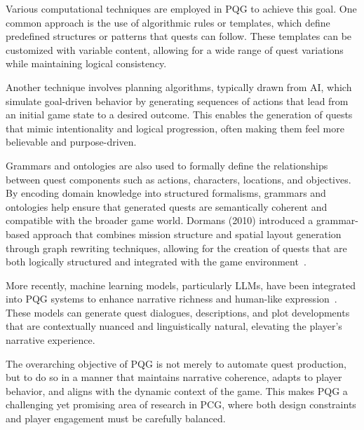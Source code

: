 Various computational techniques are employed in PQG to achieve this goal. One
common approach is the use of algorithmic rules or templates, which define predefined
structures or patterns that quests can follow. These templates can be customized with
variable content, allowing for a wide range of quest variations while maintaining logical
consistency.

Another technique involves planning algorithms, typically drawn from AI, which simulate
goal-driven behavior by generating sequences of actions that lead from an initial game
state to a desired outcome. This enables the generation of quests that mimic intentionality
and logical progression, often making them feel more believable and purpose-driven.

Grammars and ontologies are also used to formally define the relationships between
quest components such as actions, characters, locations, and objectives. By encoding
domain knowledge into structured formalisms, grammars and ontologies help ensure that
generated quests are semantically coherent and compatible with the broader game world.
Dormans (2010) introduced a grammar-based approach that combines mission structure
and spatial layout generation through graph rewriting techniques, allowing for the creation
of quests that are both logically structured and integrated with the game environment~\cite{dormans2010adventures}.

More recently, machine learning models, particularly LLMs, have been integrated into
PQG systems to enhance narrative richness and human-like expression~\cite{vartinen2022generating}. These models
can generate quest dialogues, descriptions, and plot developments that are contextually
nuanced and linguistically natural, elevating the player's narrative experience.

The overarching objective of PQG is not merely to automate quest production, but
to do so in a manner that maintains narrative coherence, adapts to player behavior,
and aligns with the dynamic context of the game. This makes PQG a challenging yet
promising area of research in PCG, where both design constraints and player engagement
must be carefully balanced.

\newpage
